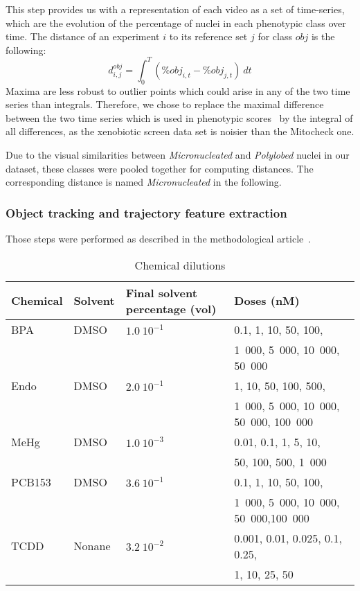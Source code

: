 This step provides us with a representation of each video as a set of time-series, which are the evolution of the percentage of nuclei in each phenotypic class over time. The distance of an experiment $i$ to its reference set $j$ for class $obj$ is the following:
\[
d^{obj}_{i,j} = \int_0^{T} (\% obj_{i,t} - \% obj_{j,t} )~dt
\]
Maxima are less robust to outlier points which could arise in any of the two time series than integrals. Therefore, we chose to replace the maximal difference between the two time series which is used in phenotypic scores~\cite{Walter2010} by the integral of all differences, as the xenobiotic screen data set is noisier than the Mitocheck one. 

Due to the visual similarities between \textit{Micronucleated} and \textit{Polylobed} nuclei in our dataset, these classes were pooled together for computing distances. The corresponding distance is named \textit{Micronucleated} in the following.

\subsubsection{Object tracking and trajectory feature extraction} Those steps were performed as described in the methodological article~\cite{motiw}.


\begin{table}[!ht]
\caption{Chemical dilutions}
\vspace{0.4cm}
\label{dilutions}
\begin{tabular}{|l|l|l|l|}
\hline
Chemical & Solvent & \parbox{3cm}{Final solvent percentage (vol)} & Doses (nM) \\
\hline
BPA & DMSO & $1.0~10^{-1} $ &0.1, 1, 10, 50, 100, \\
&&&1~000, 5~000, 10~000, 50~000\\
\hline
Endo & DMSO & $2.0~10^{-1} $ &1, 10, 50, 100, 500,\\
&&& 1~000, 5~000, 10~000, 50~000, 100~000\\
\hline
MeHg & DMSO & $1.0~10^{-3} $ & 0.01, 0.1, 1, 5, 10,\\
&&& 50, 100, 500, 1~000\\
\hline
PCB153 & DMSO & $3.6~10^{-1} $ &0.1, 1, 10, 50, 100,\\
&&& 1~000, 5~000, 10~000, 50~000,100~000\\
\hline
TCDD & Nonane &$3.2~10^{-2} $ & 0.001, 0.01,	0.025, 0.1, 0.25,\\
&&& 1, 10, 25, 50\\
\hline
\end{tabular}
\end{table}
